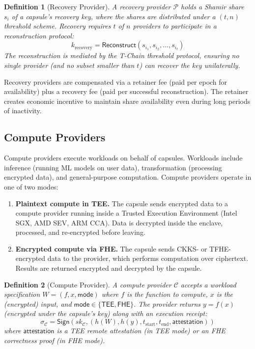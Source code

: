 \documentclass[11pt,a4paper]{article}
\newtheorem{definition}{Definition}
\begin{document}
\begin{definition}[Recovery Provider]
A recovery provider $\mathcal{P}$ holds a Shamir share $s_i$ of a capsule's
recovery key, where the shares are distributed under a $(t, n)$ threshold
scheme. Recovery requires $t$ of $n$ providers to participate in a
reconstruction protocol:
\begin{equation}
    k_{\text{recovery}} = \mathsf{Reconstruct}(s_{i_1}, s_{i_2}, \ldots, s_{i_t})
\end{equation}
The reconstruction is mediated by the T-Chain threshold protocol, ensuring
no single provider (and no subset smaller than $t$) can recover the key
unilaterally.
\end{definition}

Recovery providers are compensated via a retainer fee (paid per epoch for
availability) plus a recovery fee (paid per successful reconstruction).
The retainer creates economic incentive to maintain share availability
even during long periods of inactivity.

\subsection{Compute Providers}

Compute providers execute workloads on behalf of capsules. Workloads include
inference (running ML models on user data), transformation (processing
encrypted data), and general-purpose computation. Compute providers operate
in one of two modes:

\begin{enumerate}
    \item \textbf{Plaintext compute in TEE.} The capsule sends encrypted data
    to a compute provider running inside a Trusted Execution Environment (Intel
    SGX, AMD SEV, ARM CCA). Data is decrypted inside the enclave, processed,
    and re-encrypted before leaving.
    \item \textbf{Encrypted compute via FHE.} The capsule sends CKKS- or
    TFHE-encrypted data to the provider, which performs computation over
    ciphertext. Results are returned encrypted and decrypted by the capsule.
\end{enumerate}

\begin{definition}[Compute Provider]
A compute provider $\mathcal{C}$ accepts a workload specification $W = (f, x, \mathsf{mode})$
where $f$ is the function to compute, $x$ is the (encrypted) input, and
$\mathsf{mode} \in \{\mathsf{TEE}, \mathsf{FHE}\}$. The provider returns
$y = f(x)$ (encrypted under the capsule's key) along with an execution receipt:
\begin{equation}
    \sigma_{\mathcal{C}} = \mathsf{Sign}(sk_{\mathcal{C}}, (h(W), h(y), t_{\text{start}}, t_{\text{end}}, \mathsf{attestation}))
\end{equation}
where $\mathsf{attestation}$ is a TEE remote attestation (in TEE mode) or an
FHE correctness proof (in FHE mode).
\end{definition}
\end{document}
